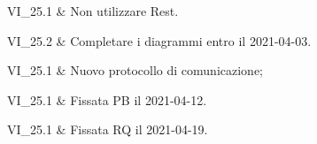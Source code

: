 VI\_25.1 & Non utilizzare Rest.

\tabularnewline

VI\_25.2 & Completare i diagrammi entro il 2021-04-03.

\tabularnewline

VI\_25.1 & Nuovo protocollo di comunicazione;

\tabularnewline
VI\_25.1 & Fissata PB il 2021-04-12.

\tabularnewline

VI\_25.1 & Fissata RQ il 2021-04-19.

\tabularnewline
